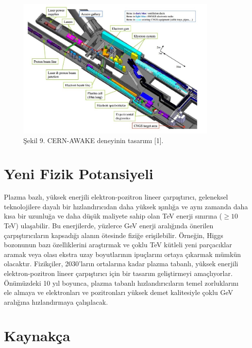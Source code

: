 \documentclass{article}
\begin{document}
	\begin{figure}[h]
 \centering
\includegraphics[width=10cm]{awake.png}
\caption*{Şekil 9. CERN-AWAKE deneyinin tasarımı [1].}
	\end{figure}
	
	
	
	\newpage

\section{Yeni Fizik Potansiyeli}	

Plazma bazlı, yüksek enerjili elektron-pozitron lineer çarpıştırıcı, geleneksel teknolojilere dayalı bir hızlandırıcıdan daha yüksek ışınlığa ve aynı zamanda daha kısa bir uzunluğa ve daha düşük maliyete sahip olan TeV enerji sınırına ($\geq 10$ TeV) ulaşabilir. Bu enerjilerde, yüzlerce GeV enerji aralığında önerilen çarpıştırıcıların kapsadığı alanın ötesinde fiziğe erişilebilir. Örneğin, Higgs bozonunun bazı özelliklerini araştırmak ve çoklu TeV kütleli yeni parçacıklar aramak veya olası ekstra uzay boyutlarının ipuçlarını ortaya çıkarmak mümkün olacaktır. Fizikçiler, 2030'ların ortalarına kadar plazma tabanlı, yüksek enerjili elektron-pozitron lineer çarpıştırıcı için bir tasarım geliştirmeyi amaçlıyorlar. Önümüzdeki 10 yıl boyunca, plazma tabanlı hızlandırıcıların temel zorluklarını ele almaya ve elektronları ve pozitronları yüksek demet kalitesiyle çoklu GeV aralığına hızlandırmaya çalışılacak.


\section{Kaynakça}
\end{document}
